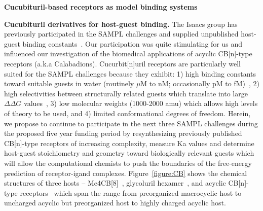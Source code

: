 \documentclass[11pt]{article}
\begin{document}
\begin{center}
{\bf Cucubituril-based receptors as model binding systems}
\end{center}


{\bf Cucubituril derivatives for host-guest binding.} 
The Isaacs group has previously participated in the SAMPL challenges and supplied unpublished host-guest binding constants~\cite{ma_acyclic_2012-2, cao_absolute_2014, She_she_glycoluril-derived_2016}.  
Our participation was quite stimulating for us and influenced our investigation of the biomedical applications of acyclic CB[n]-type receptors (a.k.a Calabadions). 
Cucurbit[n]uril receptors are particularly well suited for the SAMPL challenges because they exhibit: 1) high binding constants toward suitable guests in water (routinely $\mu$M to nM; occasionally pM to fM)~\cite{cao_attomolar_2014, liu_cucurbituril_2005, mock_structure_1986, assaf_cucurbiturils:_2015, moghaddam_new_2011, shetty_can_2015, biedermann_release_2012}, 2) high selectivities between structurally related guests which translate into large $\Delta \Delta G$ values~\cite{isaacs_stimuli_2014}, 3) low molecular weights (1000-2000 amu) which allows high levels of theory to be used, and 4) limited conformational degrees of freedom.  
Herein, we propose to continue to participate in the next three SAMPL challenges during the proposed five year funding period by resynthesizing previously published CB[n]-type receptors of increasing complexity, measure Ka values and determine host-guest stoichiometry and geometry toward biologically relevant guests which will allow the computational chemists to push the boundaries of the free-energy prediction of receptor-igand complexes.  
Figure~\ref{figure:CB} shows the chemical structures of three hosts -- Me4CB[8]~\cite{vinciguerra_synthesis_2015}, glycoluril hexamer~\cite{lucas_templated_2011}, and acyclic CB[n]-type receptors~\cite{ma_acyclic_2012, ma_acyclic_2012-1, zhang_acyclic_2014, gilberg_acyclic_2015, sigwalt_acyclic_2016, zhang_acyclic_2014-1} which span the range from preorganized macrocyclic host to uncharged acyclic but preorganized host to highly charged acyclic host.
\end{document}

